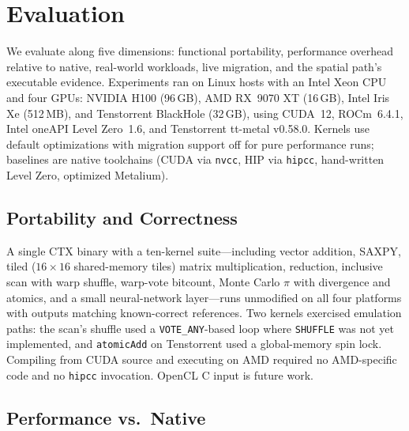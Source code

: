 \documentclass[sigplan,nonacm]{acmart}
\begin{document}
\section{Evaluation}
\label{sec:eval}

We evaluate along five dimensions: functional portability, performance
overhead relative to native, real-world workloads, live migration, and the
spatial path's executable evidence.  Experiments ran on Linux hosts with an
Intel Xeon CPU and four GPUs: NVIDIA H100 (96\,GB), AMD RX~9070 XT (16\,GB),
Intel Iris Xe (512\,MB), and Tenstorrent BlackHole (32\,GB), using CUDA~12,
ROCm~6.4.1, Intel oneAPI Level Zero~1.6, and Tenstorrent tt-metal v0.58.0.
Kernels use default optimizations with migration support off for pure
performance runs; baselines are native toolchains (CUDA via
\texttt{nvcc}, HIP via \texttt{hipcc}, hand-written Level Zero, optimized
Metalium).

\subsection{Portability and Correctness}
\label{sec:eval-portability}

A single CTX binary with a ten-kernel suite---including vector addition,
SAXPY, tiled ($16\times16$ shared-memory tiles) matrix multiplication,
reduction, inclusive scan with warp shuffle, warp-vote bitcount, Monte Carlo
$\pi$ with divergence and atomics, and a small neural-network layer---runs
unmodified on all four platforms with outputs matching known-correct
references.  Two kernels exercised emulation paths:
the scan's shuffle used a \texttt{VOTE\_ANY}-based loop where
\texttt{SHUFFLE} was not yet implemented, and \texttt{atomicAdd} on
Tenstorrent used a global-memory spin lock.  Compiling from CUDA source and
executing on AMD required no AMD-specific code and no \texttt{hipcc}
invocation.  OpenCL C input is future work.

\subsection{Performance vs.\ Native}
\label{sec:eval-perf}
\end{document}
